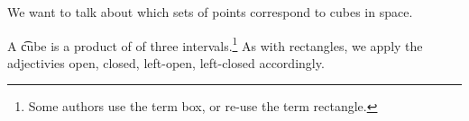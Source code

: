 

We want to talk about which sets of points correspond to cubes in space.


A \t{cube} is a product of of three intervals.\footnote{Some authors use the term box, or re-use the term rectangle.}
As with rectangles, we apply the adjectivies open, closed, left-open, left-closed accordingly.

\blankpage

